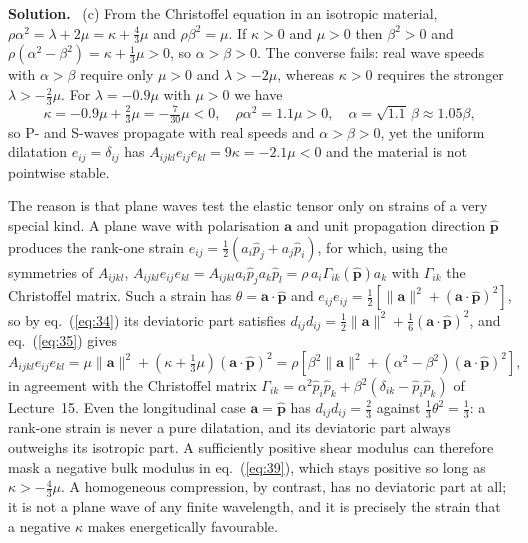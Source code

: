 \documentclass[a4paper,12pt]{paper}
\newenvironment{solution}{\par\noindent\textbf{Solution.}\ }{\par\medskip}
\begin{document}
\begin{solution}
(c) From the Christoffel equation in an isotropic material, $\rho\alpha^{2}=\lambda+2\mu=\kappa+\frac{4}{3}\mu$
and $\rho\beta^{2}=\mu$. If $\kappa>0$ and $\mu>0$ then $\beta^{2}>0$ and
$\rho(\alpha^{2}-\beta^{2})=\kappa+\frac{1}{3}\mu>0$, so $\alpha>\beta>0$. The converse fails: real
wave speeds with $\alpha>\beta$ require only $\mu>0$ and $\lambda>-2\mu$, whereas $\kappa>0$ requires the
stronger $\lambda>-\frac{2}{3}\mu$. For $\lambda=-0.9\mu$ with $\mu>0$ we have
\begin{equation}
\kappa=-0.9\mu+\tfrac{2}{3}\mu=-\tfrac{7}{30}\mu<0,\quad
\rho\alpha^{2}=1.1\mu>0,\quad \alpha=\sqrt{1.1}\,\beta\approx 1.05\beta,
\label{eq:38}
\end{equation}
so P- and S-waves propagate with real speeds and $\alpha>\beta>0$, yet the uniform dilatation
$e_{ij}=\delta_{ij}$ has $A_{ijkl}e_{ij}e_{kl}=9\kappa=-2.1\mu<0$ and the material is not pointwise stable.

The reason is that plane waves test the elastic tensor only on strains of a very special kind. A plane
wave with polarisation $\mathbf{a}$ and unit propagation direction $\hat{\mathbf{p}}$ produces the rank-one
strain $e_{ij}=\frac{1}{2}(a_{i}\hat{p}_{j}+a_{j}\hat{p}_{i})$, for which, using the symmetries of
$A_{ijkl}$, $A_{ijkl}e_{ij}e_{kl}=A_{ijkl}a_{i}\hat{p}_{j}a_{k}\hat{p}_{l}=\rho\,a_{i}\Gamma_{ik}(\hat{\mathbf{p}})a_{k}$
with $\Gamma_{ik}$ the Christoffel matrix. Such a strain has $\theta=\mathbf{a}\cdot\hat{\mathbf{p}}$ and
$e_{ij}e_{ij}=\frac{1}{2}[\|\mathbf{a}\|^{2}+(\mathbf{a}\cdot\hat{\mathbf{p}})^{2}]$, so by
eq.~(\ref{eq:34}) its deviatoric part satisfies
$d_{ij}d_{ij}=\frac{1}{2}\|\mathbf{a}\|^{2}+\frac{1}{6}(\mathbf{a}\cdot\hat{\mathbf{p}})^{2}$, and
eq.~(\ref{eq:35}) gives
\begin{equation}
A_{ijkl}e_{ij}e_{kl}=\mu\|\mathbf{a}\|^{2}+\left(\kappa+\tfrac{1}{3}\mu\right)(\mathbf{a}\cdot\hat{\mathbf{p}})^{2}
=\rho\left[\beta^{2}\|\mathbf{a}\|^{2}+(\alpha^{2}-\beta^{2})(\mathbf{a}\cdot\hat{\mathbf{p}})^{2}\right],
\label{eq:39}
\end{equation}
in agreement with the Christoffel matrix $\Gamma_{ik}=\alpha^{2}\hat{p}_{i}\hat{p}_{k}+\beta^{2}(\delta_{ik}-\hat{p}_{i}\hat{p}_{k})$
of Lecture~15. Even the longitudinal case $\mathbf{a}=\hat{\mathbf{p}}$ has $d_{ij}d_{ij}=\frac{2}{3}$
against $\frac{1}{3}\theta^{2}=\frac{1}{3}$: a rank-one strain is never a pure dilatation, and its
deviatoric part always outweighs its isotropic part. A sufficiently positive shear modulus can therefore
mask a negative bulk modulus in eq.~(\ref{eq:39}), which stays positive so long as
$\kappa>-\frac{4}{3}\mu$. A homogeneous compression, by contrast, has no deviatoric part at all; it is not
a plane wave of any finite wavelength, and it is precisely the strain that a negative $\kappa$ makes
energetically favourable.


\end{solution}
\end{document}
